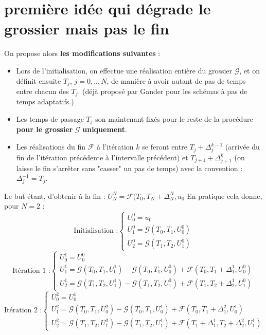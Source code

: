 \documentclass[review,onefignum,onetabnum]{siamart220329}
\newcommand{\G}{\mathcal{G}}
\newcommand{\F}{\mathcal{F}}
\begin{document}
\section{première idée qui dégrade le grossier mais pas le fin}
On propose alors \textbf{les modifications suivantes} :
\begin{itemize}
    \item Lors de l'initialisation, on effectue une réalisation entière du grossier $\G$, et on définit ensuite $T_j$, $j = 0,..,N$, de manière à avoir autant de pas de temps entre chacun des $T_j$. (déjà proposé par Gander pour les schémas à pas de temps adaptatifs.)
    \item Les temps de passage $T_j$ son maintenant fixés pour le reste de la procédure \textbf{pour le grossier}  $\G$ \textbf{uniquement}.
    \item Les réalisations du fin $\F$ à l'itération $k$ se feront entre $T_j + \Delta^{k-1}_{j}$ (arrivée du fin de l'itération précédente à l'intervalle précédent) et $T_{j+1} + \Delta^{k}_{j+1}$ (on laisse le fin s'arrêter sans "casser" un pas de temps) avec la convention : $\Delta^{-1}_{j} = T_j$.
\end{itemize}
Le but étant, d'obtenir à la fin : $U^{N}_{N} = \F(T_0,T_{N}+\Delta^{N}_{N},u_0$
En pratique cela donne, pour $N = 2$ :
\begin{equation*}
\text{Initialisation :}
\begin{cases}
U^0_0 = u_0 \\
U^0_1 = \G(T_{0},T_{1},U^{0}_{0}) \\
U^0_2 = \G(T_{1},T_{2},U^{0}_{1})
\end{cases}
\end{equation*}
\begin{equation*}
\text{Itération 1 :}
\begin{cases}
U^1_0 = U^0_0 \\
U^1_1 = \G(T_{0},T_{1},U^{1}_{0}) - \G(T_{0},T_{1},U^{0}_{0}) + \F(T_{0},T_{1} + \Delta^1_1,U^{0}_{0}) \\
U^1_2 = \G(T_{1},T_{2},U^{1}_{1}) - \G(T_{1},T_{2},U^{0}_{1}) + \F(T_{1},T_{2} + \Delta^1_2,U^{0}_{1}) 
\end{cases}
\end{equation*}
\begin{equation*}
\text{Itération 2 :}
\begin{cases}
U^2_0 = U^1_0 \\
U^2_1 = \G(T_{0},T_{1},U^{2}_{0}) - \G(T_{0},T_{1},U^{1}_{0}) + \F(T_{0},T_{1} + \Delta^2_1,U^{1}_{0}) \\
U^2_2 = \G(T_{1},T_{2},U^{2}_{1}) - \G(T_{1},T_{2},U^{1}_{1}) + \F(T_{1} + \Delta^1_1 ,T_{2} + \Delta^2_2,U^{1}_{1}) 
\end{cases}
\end{equation*}
\end{document}
